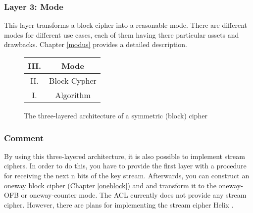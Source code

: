\subsubsection{Layer 3: Mode}
This layer transforms a block cipher into a reasonable mode. There are different
modes for different use cases, each of them having there particular assets and
drawbacks. Chapter \ref{modus} provides a detailed description.

\begin{figure}
  \begin{center}
    \huge
    \begin{tabular}{|c @{\ } c|}\hline
      III. & Mode\\
      \hline
      II. & Block Cypher\\
      \hline
      I. & Algorithm\\
    \hline
    \end{tabular}
  \end{center}
\caption{The three-layered architecture of a symmetric (block) cipher}
\end{figure}

\subsubsection{Comment}
By using this three-layered architecture, it is also possible to implement
stream ciphers. In order to do this, you have to provide the first layer with
a procedure for receiving the next n bits of the key stream. Afterwards, you
can construct an oneway block cipher (Chapter \ref{oneblock}) and and transform
it to the oneway-OFB or oneway-counter mode. The ACL currently does not provide
any stream cipher. However, there are plans for implementing the stream cipher
Helix \cite{helix}.
